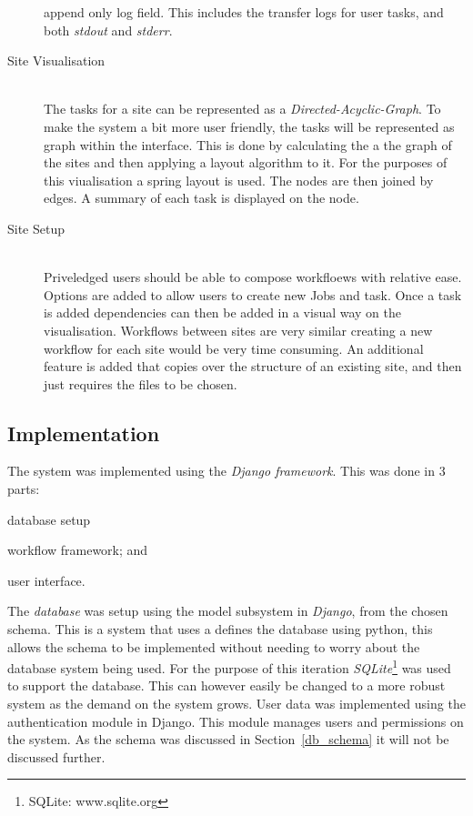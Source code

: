 \documentclass[12pt,a4paper]{report}
\begin{document}
\begin{description}
        append only log field. This includes the transfer logs for user tasks, and both
        \emph{stdout} and \emph{stderr}.
    \item[Site Visualisation] \hfill \\
        The tasks for a site can be represented as a \emph{Directed-Acyclic-Graph}. To
        make the system a bit more user friendly, the tasks will be represented as
        graph within the interface. This is done by calculating the a the graph of
        the sites and then applying a layout algorithm to it. For the purposes of this
        viualisation a spring layout is used. The nodes are then joined by edges. A
        summary of each task is displayed on the node.
    \item[Site Setup] \hfill \\
        Priveledged users should be able to compose workfloews with relative ease. Options
        are added to allow users to create new Jobs and task. Once a task is added dependencies
        can then be added in a visual way on the visualisation. Workflows between sites are very similar
        creating a new workflow for each site would be very time consuming. An additional
        feature is added that copies over the structure of an existing site, and then
        just requires the files to be chosen.
\end{description}
\subsection{Implementation}
The system was implemented using the \emph{Django framework}. This was done in 3 parts:
\begin{inparaenum}
\item database setup
\item workflow framework; and
\item user interface.
\end{inparaenum}

The \emph{database} was setup using the model subsystem in \emph{Django}, from the chosen schema.
This is a system that uses a defines the database using python, this allows the schema
to be implemented without needing to worry about the database system being used. For the
purpose of this iteration \emph{SQLite}\footnote{SQLite: www.sqlite.org} was used to
support the database. This can however easily be changed to a more robust system as the demand
on the system grows. User data was implemented using the authentication module in Django. This
module manages users and permissions on the system. As the schema was discussed in Section~\ref{db_schema}
it will not be discussed further.
\end{document}
